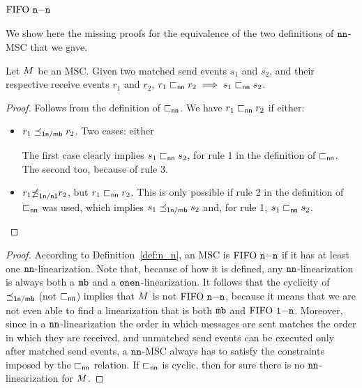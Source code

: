 \paragraph*{\bf $\text{FIFO } \mathtt{n\mathsf{-}n}$}

We show here the missing proofs for the equivalence of the two definitions of $\mathtt{nn}$-MSC that we gave.

\begin{proposition}\label{prop:nn_first_prop}
	Let $M$ be an MSC. Given two matched send events $s_1$ and $s_2$, and their respective receive events $r_1$ and $r_2$, $r_1 \sqsubset_{\mathsf{nn}} r_2 \implies s_1 \sqsubset_{\mathsf{nn}} s_2$.
\end{proposition}
\begin{proof}
    Follows from the definition of $\sqsubset_{\mathsf{nn}}$. We have $r_1 \sqsubset_{\mathsf{nn}} r_2$ if either:
    \begin{itemize}%
        \item $r_1 \preceq_{\mathsf{1n/\mathsf{mb}}} r_2$. Two cases: either 
        The first case clearly implies $s_1 \sqsubset_{\mathsf{nn}} s_2$, for rule 1 in the definition of $\sqsubset_{\mathsf{nn}}$. The second too, because of rule 3.
        \item  $r_1 {\not\preceq}_{\mathsf{1n/n1}} r_2$, but $r_1 \sqsubset_{\mathsf{nn}} r_2$. This is only possible if rule 2 in the definition of $\sqsubset_{\mathsf{nn}}$ was used, which implies $s_1 \preceq_{\mathsf{1n/\mathsf{mb}}} s_2$ and, for rule 1, $s_1 \sqsubset_{\mathsf{nn}} s_2$.
    \end{itemize}
\end{proof}

\nnsecondprop*
\begin{proof}
    According to Definition~\ref{def:n_n}, an MSC is $\text{FIFO } \mathtt{n\mathsf{-}n}$ if it has at least one $\mathtt{nn}$-linearization. Note that, because of how it is defined, any $\mathtt{nn}$-linearization is always both a $\mathtt{mb}$ and a $\mathtt{onen}$-linearization. It follows that the cyclicity of $\preceq_{\mathsf{1n/\mathsf{mb}}}$ (not $\sqsubset_{\mathsf{nn}}$) implies that $M$ is not $\text{FIFO } \mathtt{n\mathsf{-}n}$, because it means that we are not even able to find a linearization that is both $\mathtt{mb}$ and $\text{FIFO } \mathtt{1\mathsf{-}n}$. Moreover, since in a $\mathtt{nn}$-linearization the order in which messages are sent matches the order in which they are received, and unmatched send events can be executed only after matched send events, a $\mathtt{nn}$-MSC always has to satisfy the constraints imposed by the $\sqsubset_{\mathsf{nn}}$ relation. If $\sqsubset_{\mathsf{nn}}$ is cyclic, then for sure there is no $\mathtt{nn}$-linearization for $M$.
\end{proof}    

